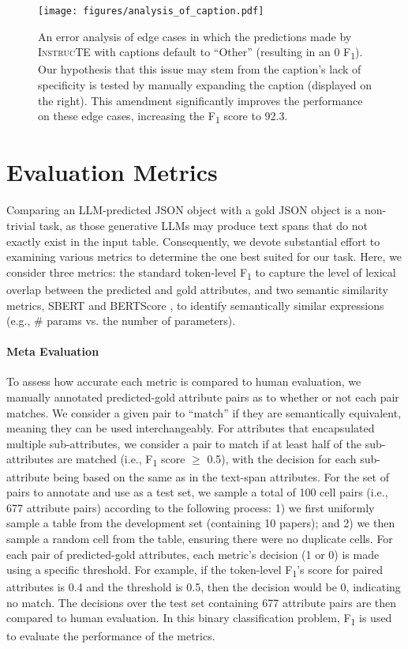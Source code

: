 \documentclass[11pt]{article}
\begin{document}
\begin{figure*}[!ht]
    \centering
    \texttt{[image: figures/analysis\_of\_caption.pdf]}
    \caption{
An error analysis of edge cases in which the predictions made by \textsc{InstrucTE} with captions default to ``Other'' (resulting in an 0 F\textsubscript{1}). Our hypothesis that this issue may stem from the caption's lack of specificity is tested by manually expanding the caption (displayed on the right). This amendment significantly improves the performance on these edge cases, increasing the F\textsubscript{1} score to 92.3.
    }
    \label{fig:analysis_of_caption}
\end{figure*}


\section{Evaluation Metrics}
\label{sec:eval_metric_app}



Comparing an LLM-predicted JSON object with a gold JSON object is a non-trivial task, as those generative LLMs may produce text spans that do not exactly exist in the input table. Consequently, we devote substantial effort to examining various metrics to determine the one best suited for our task. Here, we consider three metrics: the standard token-level F\textsubscript{1} to capture the level of lexical overlap between the predicted and gold attributes, and two semantic similarity metrics, SBERT \citep{reimers-2019-sentence-bert} and BERTScore \citep{bert-score}, to identify semantically similar expressions (e.g., \# params vs. the number of parameters). 

\paragraph{Meta Evaluation}
To assess how accurate each metric is compared to human evaluation, we manually annotated predicted-gold attribute pairs as to whether or not each pair matches. We consider a given pair to ``match'' if they are semantically equivalent, meaning they can be used interchangeably. For attributes that encapsulated multiple sub-attributes, we consider a pair to match if at least half of the sub-attributes are matched (i.e., F\textsubscript{1} score $\geq$ 0.5), with the decision for each sub-attribute being based on the same as in the text-span attributes. For the set of pairs to annotate and use as a test set, we sample a total of 100 cell pairs (i.e., 677 attribute pairs) according to the following process: 1) we first uniformly sample a table from the development set (containing 10 papers); and 2) we then sample a random cell from the table, ensuring there were no duplicate cells. For each pair of predicted-gold attributes, each metric's decision (1 or 0) is made using a specific threshold. For example, if the token-level F\textsubscript{1}'s score for paired attributes is 0.4 and the threshold is 0.5, then the decision would be 0, indicating no match. The decisions over the test set containing 677 attribute pairs are then compared to human evaluation. In this binary classification problem, F\textsubscript{1} is used to evaluate the performance of the metrics.
\end{document}
